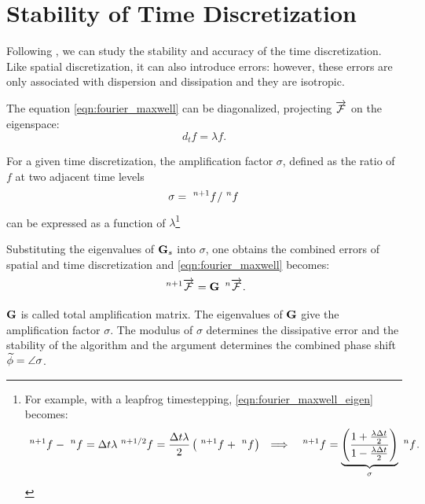 \section{Stability of Time Discretization}
 \label{sec:stability_time}

Following \cite{liu_fourier}, we can study the stability and accuracy
of the time discretization. Like spatial discretization, it can also introduce
errors: however, these errors are only associated with dispersion and
dissipation and they are isotropic.

The equation \ref{eqn:fourier_maxwell} can be diagonalized, projecting
$\Vector{\mathcal{F}}$ on the eigenspace:
\begin{equation} \label{eqn:fourier_maxwell_eigen}
  d_t f = \lambda f .
\end{equation}

For a given time discretization, the amplification factor $\sigma$,
defined as the ratio of $f$ at two adjacent time levels
\begin{equation*}
  \sigma = \Disc{f}{}{n+1} / \Disc{f}{}{n}
\end{equation*}
can be expressed as a function of $\lambda$\footnote{For example,
with a leapfrog timestepping, \ref{eqn:fourier_maxwell_eigen} becomes:
\begin{align*}
  \Disc{f}{}{n+1} - \Disc{f}{}{n} = \deltat \lambda \Disc{f}{}{n+1/2}
  = \frac{\deltat \lambda}{2} \left( \Disc{f}{}{n+1} + \Disc{f}{}{n}
  \right) && \Longrightarrow && \Disc{f}{}{n+1} =
  \underbrace{\left(\frac{1+\frac{\lambda \deltat}{2}}{1-\frac{\lambda
  \deltat}{2}}\right)}_{\sigma} \Disc{f}{}{n} .
\end{align*}}

Substituting the eigenvalues of $\Matrix{G}_s$ into $\sigma$, one
obtains the combined errors of spatial and time discretization and
\ref{eqn:fourier_maxwell} becomes:
\begin{equation*}
  \Disc{\Vector{\mathcal{F}}}{}{n+1} =
  \Prod{\Matrix{G}}{\Disc{\Vector{\mathcal{F}}}{}{n}} .
\end{equation*}

$\Matrix{G}$ is called total amplification matrix. The eigenvalues of
$\Matrix{G}$ give the amplification factor $\sigma$. The modulus of
$\sigma$ determines the dissipative error and the stability of the
algorithm and the argument determines the combined phase shift
$\Dual{\phi} = \Arg{\sigma}$.


